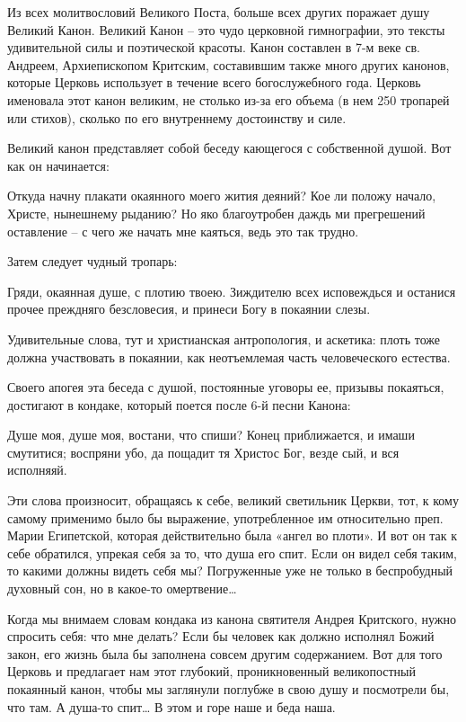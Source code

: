 Из всех молитвословий Великого Поста, больше всех других поражает душу Великий Канон. Великий Канон – это чудо церковной гимнографии, это тексты удивительной силы и поэтической красоты. Канон составлен в 7-м веке св. Андреем, Архиепископом Критским, составившим также много других канонов, которые Церковь использует в течение всего богослужебного года. Церковь именовала этот канон великим, не столько из-за его объема (в нем 250 тропарей или стихов), сколько по его внутреннему достоинству и силе.


Великий канон представляет собой беседу кающегося с собственной душой. Вот как он начинается:


Откуда начну плакати окаянного моего жития деяний? Кое ли положу начало, Христе, нынешнему рыданию? Но яко благоутробен даждь ми прегрешений оставление – с чего же начать мне каяться, ведь это так трудно.


Затем следует чудный тропарь:


Гряди, окаянная душе, с плотию твоею. Зиждителю всех исповеждься и останися прочее преждняго безсловесия, и принеси Богу в покаянии слезы.


Удивительные слова, тут и христианская антропология, и аскетика: плоть тоже должна участвовать в покаянии, как неотъемлемая часть человеческого естества.


Своего апогея эта беседа с душой, постоянные уговоры ее, призывы покаяться, достигают в кондаке, который поется после 6-й песни Канона:


Душе моя, душе моя, востани, что спиши? Конец приближается, и имаши смутитися; воспряни убо, да пощадит тя Христос Бог, везде сый, и вся исполняяй.


Эти слова произносит, обращаясь к себе, великий светильник Церкви, тот, к кому самому применимо было бы выражение, употребленное им относительно преп. Марии Египетской, которая действительно была «ангел во плоти». И вот он так к себе обратился, упрекая себя за то, что душа его спит. Если он видел себя таким, то какими должны видеть себя мы? Погруженные уже не только в беспробудный духовный сон, но в какое-то омертвение…


Когда мы внимаем словам кондака из канона святителя Андрея Критского, нужно спросить себя: что мне делать? Если бы человек как должно исполнял Божий закон, его жизнь была бы заполнена совсем другим содержанием. Вот для того Церковь и предлагает нам этот глубокий, проникновенный великопостный покаянный канон, чтобы мы заглянули поглубже в свою душу и посмотрели бы, что там. А душа-то спит… В этом и горе наше и беда наша.


